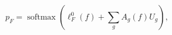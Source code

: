 \begin{equation}
p_F=\operatorname{softmax}\!\left(\ell_F^0(f)+\sum_g A_g(f)U_g\right),\tag{3}\label{eq:original-3}
\end{equation}

